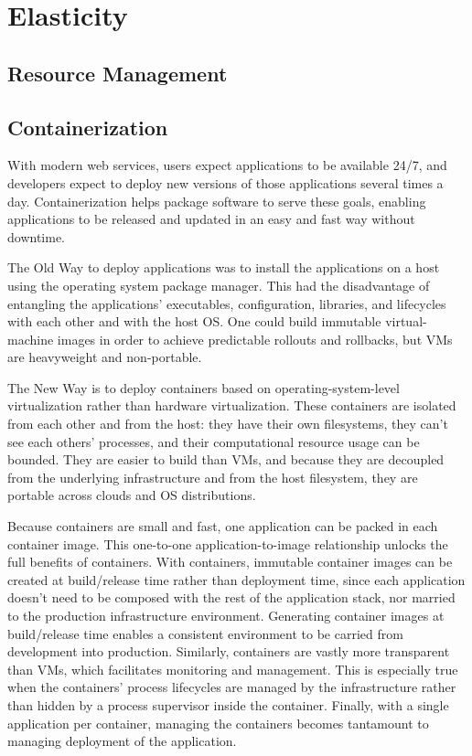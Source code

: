 \chapter{Elasticity}
\label{chp:elasticity}


\lipsum[1]


\section{Resource Management}
\label{sec:containers-orchestration-resource-management}

\lipsum[1]


\section{Containerization}
\label{sec:containers-orchestration-containerization}

With modern web services, users expect applications to be available 24/7, and developers expect to deploy new versions of those applications several times a day. Containerization helps package software to serve these goals, enabling applications to be released and updated in an easy and fast way without downtime.

The Old Way to deploy applications was to install the applications on a host using the operating system package manager. This had the disadvantage of entangling the applications’ executables, configuration, libraries, and lifecycles with each other and with the host OS. One could build immutable virtual-machine images in order to achieve predictable rollouts and rollbacks, but VMs are heavyweight and non-portable.

The New Way is to deploy containers based on operating-system-level virtualization rather than hardware virtualization. These containers are isolated from each other and from the host: they have their own filesystems, they can’t see each others’ processes, and their computational resource usage can be bounded. They are easier to build than VMs, and because they are decoupled from the underlying infrastructure and from the host filesystem, they are portable across clouds and OS distributions.

Because containers are small and fast, one application can be packed in each container image. This one-to-one application-to-image relationship unlocks the full benefits of containers. With containers, immutable container images can be created at build/release time rather than deployment time, since each application doesn’t need to be composed with the rest of the application stack, nor married to the production infrastructure environment. Generating container images at build/release time enables a consistent environment to be carried from development into production. Similarly, containers are vastly more transparent than VMs, which facilitates monitoring and management. This is especially true when the containers’ process lifecycles are managed by the infrastructure rather than hidden by a process supervisor inside the container. Finally, with a single application per container, managing the containers becomes tantamount to managing deployment of the application.

